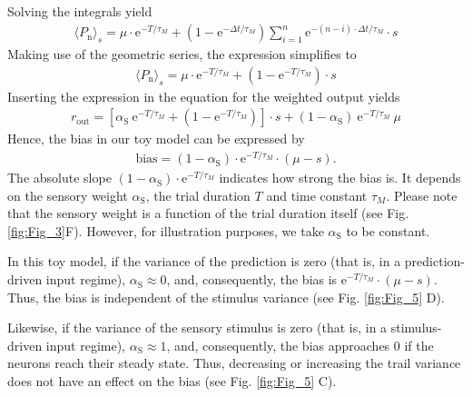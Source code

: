 \documentclass[10pt,a4paper]{article}
\begin{document}
%
Solving the integrals yield
%
\begin{align}
\langle P_\mathrm{n} \rangle_s = \mu \cdot \mathrm{e}^{-T/\tau_M} + \left( 1 -   \mathrm{e}^{-\Delta t/\tau_M} \right) \sum_{i=1}^{n} \mathrm{e}^{-(n-i)\cdot \Delta t/ \tau_M} \cdot s
\end{align}
%
Making use of the geometric series, the expression simplifies to
%
\begin{align*}
\langle P_\mathrm{n} \rangle_s =  \mu \cdot \mathrm{e}^{-T/\tau_M} + \left( 1 -   \mathrm{e}^{-T/\tau_M} \right) \cdot s
\end{align*}
%
Inserting the expression in the equation for the weighted output yields
%
\begin{align*}
 r_\mathrm{out} = \left[ \alpha_\mathrm{S}\  \mathrm{e}^{-T/\tau_M} + \left( 1 -   \mathrm{e}^{-T/\tau_M} \right)\right] \cdot s + \left( 1 -\alpha_\mathrm{S} \right)\ \mathrm{e}^{-T/\tau_M}\ \mu
\end{align*}
%
Hence, the bias in our toy model can be expressed by
%
\begin{align*}
 \mathrm{bias} = \left( 1 -\alpha_\mathrm{S} \right)\cdot \mathrm{e}^{-T/\tau_M}\cdot \left(\mu - s \right).
\end{align*}
%
The absolute slope $\left( 1 -\alpha_\mathrm{S} \right)\cdot \mathrm{e}^{-T/\tau_M}$ indicates how strong the bias is. It depends on the sensory weight $\alpha_\mathrm{S}$, the trial duration $T$ and time constant $\tau_M$. Please note that the sensory weight is a function of the trial duration itself (see Fig. \ref{fig:Fig_3}F). However, for illustration purposes, we take $\alpha_\mathrm{S}$ to be constant.
 
In this toy model, if the variance of the prediction is zero (that is, in a prediction-driven input regime), $\alpha_\mathrm{S} \approx 0$, and, consequently, the bias is $\mathrm{e}^{-T/\tau_M}\cdot \left(\mu - s \right)$. Thus, the bias is independent of the stimulus variance (see Fig. \ref{fig:Fig_5} D).

Likewise, if the variance of the sensory stimulus is zero (that is, in a stimulus-driven input regime), $\alpha_\mathrm{S} \approx 1$, and, consequently, the bias approaches $0$ if the neurons reach their steady state. Thus, decreasing or increasing the trail variance does not have an effect on the bias (see Fig. \ref{fig:Fig_5} C).

\end{document}
